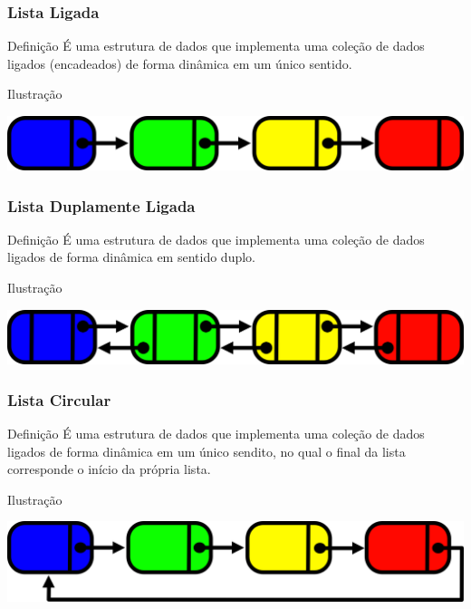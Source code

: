 \documentclass{beamer}
\begin{document}
\begin{frame}
\frametitle{Lista Ligada}

\begin{block}{Definição}
	É uma estrutura de dados que implementa uma coleção de dados ligados (encadeados) de forma dinâmica em um único sentido.
\end{block} \vfill

\begin{exampleblock}{Ilustração}
	\begin{center}
	\includegraphics[scale=0.5]{img/lista-ligada.png}
	\end{center}
\end{exampleblock}
\end{frame}

\begin{frame}
\frametitle{Lista Duplamente Ligada}

\begin{block}{Definição}
É uma estrutura de dados que implementa uma coleção de dados ligados de forma dinâmica em sentido duplo.
\end{block}\vfill

\begin{exampleblock}{Ilustração}
	\begin{center}
		\includegraphics[scale=0.5]{img/lista-dupla.png}
	\end{center}
\end{exampleblock}
\end{frame}

\begin{frame}
\frametitle{Lista Circular}

\begin{block}{Definição}
	É uma estrutura de dados que implementa uma coleção de dados ligados de forma dinâmica em um único sendito, no qual o final da lista corresponde o início da própria lista.
\end{block}\vfill

\begin{exampleblock}{Ilustração}
	\begin{center}
		\includegraphics[scale=0.5]{img/lista-circular.png}
	\end{center}
\end{exampleblock}
\end{frame}
\end{document}
